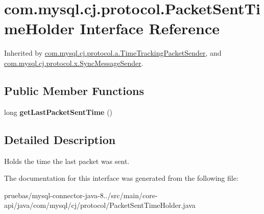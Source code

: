 \hypertarget{interfacecom_1_1mysql_1_1cj_1_1protocol_1_1_packet_sent_time_holder}{}\section{com.\+mysql.\+cj.\+protocol.\+Packet\+Sent\+Time\+Holder Interface Reference}
\label{interfacecom_1_1mysql_1_1cj_1_1protocol_1_1_packet_sent_time_holder}


Inherited by \mbox{\hyperlink{classcom_1_1mysql_1_1cj_1_1protocol_1_1a_1_1_time_tracking_packet_sender}{com.\+mysql.\+cj.\+protocol.\+a.\+Time\+Tracking\+Packet\+Sender}}, and \mbox{\hyperlink{classcom_1_1mysql_1_1cj_1_1protocol_1_1x_1_1_sync_message_sender}{com.\+mysql.\+cj.\+protocol.\+x.\+Sync\+Message\+Sender}}.

\subsection*{Public Member Functions}
\begin{DoxyCompactItemize}
\item 
\mbox{\label{interfacecom_1_1mysql_1_1cj_1_1protocol_1_1_packet_sent_time_holder_a0f02a4b248787dd3852b5258a9aa5918}} 
long {\bfseries get\+Last\+Packet\+Sent\+Time} ()
\end{DoxyCompactItemize}


\subsection{Detailed Description}
Holds the time the last packet was sent. 

The documentation for this interface was generated from the following file\+:\begin{DoxyCompactItemize}
\item 
pruebas/mysql-\/connector-\/java-\/8../src/main/core-\/api/java/com/mysql/cj/protocol/Packet\+Sent\+Time\+Holder.\+java\end{DoxyCompactItemize}
